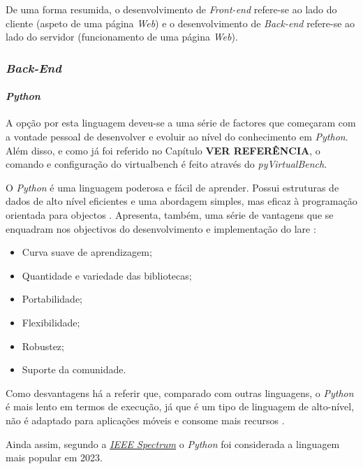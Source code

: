 De uma forma resumida, o desenvolvimento de \textit{Front-end} refere-se ao lado do cliente (aspeto de uma página \textit{Web}) e o desenvolvimento de \textit{Back-end} refere-se ao lado do servidor (funcionamento de uma página \textit{Web}).

\subsubsection{\textit{Back-End}}
\paragraph{\textit{Python}}
A opção por esta linguagem deveu-se a uma série de factores que começaram com a vontade pessoal de desenvolver e evoluir ao nível do conhecimento em \textit{Python}. Além disso, e como já foi referido no Capítulo \textbf{VER REFERÊNCIA}, o comando e configuração do \acrshort{virtualbench} é feito através do \textit{pyVirtualBench}.

O \textit{Python} é uma linguagem poderosa e fácil de aprender. Possui estruturas de dados de alto nível eficientes e uma abordagem simples, mas eficaz à programação orientada para objectos \cite{ThePython}. Apresenta, também, uma série de vantagens que se enquadram nos objectivos do desenvolvimento e implementação do \acrshort{lare} \cite{pythonvantagens}:
\begin{itemize}
    \item Curva suave de aprendizagem;
    \item Quantidade e variedade das bibliotecas;
    \item Portabilidade;
    \item Flexibilidade;
    \item Robustez;
    \item Suporte da comunidade.
\end{itemize}

Como desvantagens há a referir que, comparado com outras linguagens, o \textit{Python} é mais lento em termos de execução, já que é um tipo de linguagem de alto-nível, não é adaptado para aplicações móveis e consome mais recursos \cite{pythonvantagens} \cite{5MainDispython}.

Ainda assim, segundo a \textit{\href{https://spectrum.ieee.org/the-top-programming-languages-2023}{\textit{IEEE Spectrum}}} o \textit{Python} foi considerada a linguagem mais popular em 2023.

